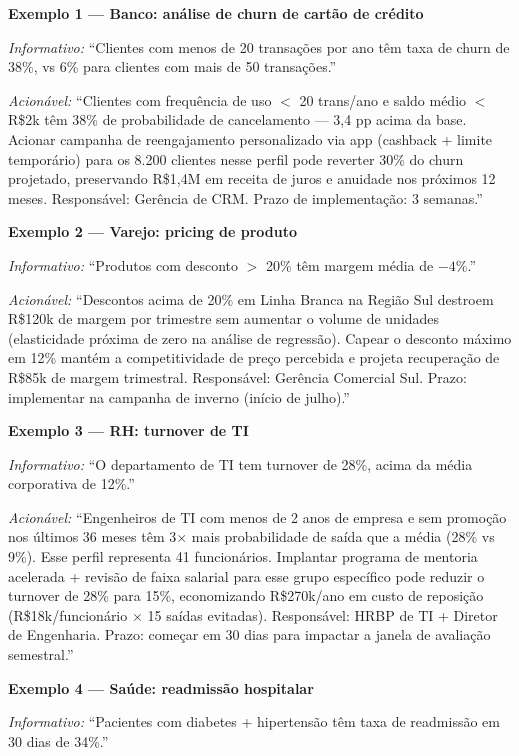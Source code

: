 \medskip
\textbf{Exemplo 1 --- Banco: análise de churn de cartão de crédito}

\textit{Informativo:} ``Clientes com menos de 20 transações por ano têm taxa de churn de 38\%, vs 6\% para clientes com mais de 50 transações.''

\textit{Acionável:} ``Clientes com frequência de uso $<$ 20 trans/ano e saldo médio $<$ R\$2k têm 38\% de probabilidade de cancelamento --- 3,4 pp acima da base. Acionar campanha de reengajamento personalizado via app (cashback + limite temporário) para os 8.200 clientes nesse perfil pode reverter 30\% do churn projetado, preservando R\$1,4M em receita de juros e anuidade nos próximos 12 meses. Responsável: Gerência de CRM. Prazo de implementação: 3 semanas.''

\medskip
\textbf{Exemplo 2 --- Varejo: pricing de produto}

\textit{Informativo:} ``Produtos com desconto $>$ 20\% têm margem média de $-4\%$.''

\textit{Acionável:} ``Descontos acima de 20\% em Linha Branca na Região Sul destroem R\$120k de margem por trimestre sem aumentar o volume de unidades (elasticidade próxima de zero na análise de regressão). Capear o desconto máximo em 12\% mantém a competitividade de preço percebida e projeta recuperação de R\$85k de margem trimestral. Responsável: Gerência Comercial Sul. Prazo: implementar na campanha de inverno (início de julho).''

\medskip
\textbf{Exemplo 3 --- RH: turnover de TI}

\textit{Informativo:} ``O departamento de TI tem turnover de 28\%, acima da média corporativa de 12\%.''

\textit{Acionável:} ``Engenheiros de TI com menos de 2 anos de empresa e sem promoção nos últimos 36 meses têm 3$\times$ mais probabilidade de saída que a média (28\% vs 9\%). Esse perfil representa 41 funcionários. Implantar programa de mentoria acelerada + revisão de faixa salarial para esse grupo específico pode reduzir o turnover de 28\% para 15\%, economizando R\$270k/ano em custo de reposição (R\$18k/funcionário $\times$ 15 saídas evitadas). Responsável: HRBP de TI + Diretor de Engenharia. Prazo: começar em 30 dias para impactar a janela de avaliação semestral.''

\medskip
\textbf{Exemplo 4 --- Saúde: readmissão hospitalar}

\textit{Informativo:} ``Pacientes com diabetes + hipertensão têm taxa de readmissão em 30 dias de 34\%.''

